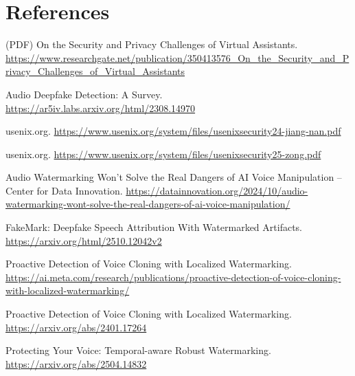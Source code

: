 \section*{References}
\small
\noindent [1] [15] (PDF) On the Security and Privacy Challenges of Virtual Assistants. \url{https://www.researchgate.net/publication/350413576_On_the_Security_and_Privacy_Challenges_of_Virtual_Assistants}\par
\noindent [2] [6] [7] [8] [13] [17] [18] [38] [39] [40] [41] [42] [43] [44] [45] [48] [2308.14970] Audio Deepfake Detection: A Survey. \url{https://ar5iv.labs.arxiv.org/html/2308.14970}\par
\noindent [3] [16] usenix.org. \url{https://www.usenix.org/system/files/usenixsecurity24-jiang-nan.pdf}\par
\noindent [4] [5] [12] [23] [24] [29] [30] [31] [49] usenix.org. \url{https://www.usenix.org/system/files/usenixsecurity25-zong.pdf}\par
\noindent [9] [11] [19] [20] [21] [22] Audio Watermarking Won’t Solve the Real Dangers of AI Voice Manipulation -- Center for Data Innovation. \url{https://datainnovation.org/2024/10/audio-watermarking-wont-solve-the-real-dangers-of-ai-voice-manipulation/}\par
\noindent [10] [28] [35] [36] [37] [46] [47] [50] [51] [52] [53] [54] FakeMark: Deepfake Speech Attribution With Watermarked Artifacts. \url{https://arxiv.org/html/2510.12042v2}\par
\noindent [14] Proactive Detection of Voice Cloning with Localized Watermarking. \url{https://ai.meta.com/research/publications/proactive-detection-of-voice-cloning-with-localized-watermarking/}\par
\noindent [25] [26] [27] [2401.17264] Proactive Detection of Voice Cloning with Localized Watermarking. \url{https://arxiv.org/abs/2401.17264}\par
\noindent [32] [33] [34] [2504.14832] Protecting Your Voice: Temporal-aware Robust Watermarking. \url{https://arxiv.org/abs/2504.14832}\par